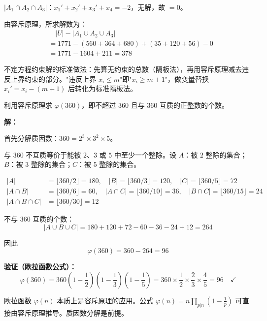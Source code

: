 \documentclass[12pt, a4paper]{ctexart}
\begin{document}
\(|A_1\cap A_2\cap A_3|\)：\(x_1'+x_2'+x_3'+x_4 = -2\)，无解，故 \(= 0\)。

由容斥原理，所求解数为：
\begin{align*}
&\quad |U| - |A_1\cup A_2\cup A_3| \\
&= 1771 - (560+364+680) + (35+120+56) - 0 \\
&= 1771 - 1604 + 211 = \boxed{378}
\end{align*}

\begin{tipbox}[方法总结]
不定方程约束解的标准做法：先算无约束的总数（隔板法），再用容斥原理减去违反上界约束的部分。"违反上界 \(x_i \le m\)"即"\(x_i \ge m+1\)"，做变量替换 \(x_i' = x_i - (m+1)\) 后转化为标准隔板法。
\end{tipbox}

\vspace{6pt}

\begin{examplebox}
利用容斥原理求 \(\varphi(360)\)，即不超过 \(360\) 且与 \(360\) 互质的正整数的个数。
\end{examplebox}

\textbf{解：}

首先分解质因数：\(360 = 2^3 \times 3^2 \times 5\)。

与 \(360\) 不互质等价于能被 \(2\)、\(3\) 或 \(5\) 中至少一个整除。设 \(A\)：被 \(2\) 整除的集合；\(B\)：被 \(3\) 整除的集合；\(C\)：被 \(5\) 整除的集合。

\begin{align*}
|A| &= \lfloor 360/2 \rfloor = 180, \quad |B| = \lfloor 360/3 \rfloor = 120, \quad |C| = \lfloor 360/5 \rfloor = 72 \\
|A\cap B| &= \lfloor 360/6 \rfloor = 60, \quad |A\cap C| = \lfloor 360/10 \rfloor = 36, \quad |B\cap C| = \lfloor 360/15 \rfloor = 24 \\
|A\cap B\cap C| &= \lfloor 360/30 \rfloor = 12
\end{align*}

不与 \(360\) 互质的个数：
\[
|A\cup B\cup C| = 180+120+72 - 60-36-24 + 12 = 264
\]

因此
\[
\varphi(360) = 360 - 264 = \boxed{96}
\]

\textbf{验证（欧拉函数公式）：}
\[
\varphi(360) = 360\left(1-\frac{1}{2}\right)\left(1-\frac{1}{3}\right)\left(1-\frac{1}{5}\right) = 360 \times \frac{1}{2} \times \frac{2}{3} \times \frac{4}{5} = 96 \quad \checkmark
\]

\begin{tipbox}[方法总结]
欧拉函数 \(\varphi(n)\) 本质上是容斥原理的应用。公式 \(\varphi(n) = n\prod_{p|n}\left(1-\frac{1}{p}\right)\) 可直接由容斥原理推导。质因数分解是前提。
\end{tipbox}
\end{document}
